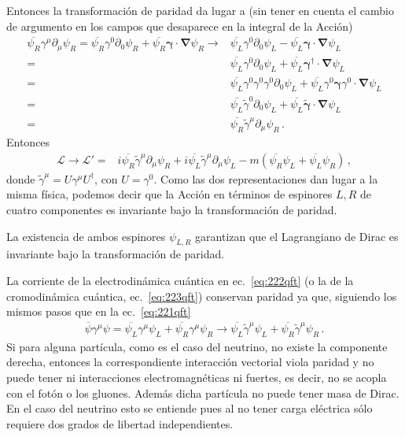 Entonces la transformación de paridad da lugar a (sin tener en cuenta el cambio de argumento en los campos que desaparece en la integral de la Acción)
\begin{align}
  \overline{\psi_R}\gamma^\mu\partial_\mu\psi_R=\overline{\psi_R}\gamma^0\partial_0\psi_R+\overline{\psi_R}\boldsymbol{\gamma}\cdot\boldsymbol{\nabla}\psi_R 
\to&\overline{\psi_L}\gamma^0\partial_0\psi_L-\overline{\psi_L}\boldsymbol{\gamma}\cdot\boldsymbol{\nabla}\psi_L\nonumber\\
=&\overline{\psi_L}\gamma^0\partial_0\psi_L+\overline{\psi_L}\boldsymbol{\gamma}^\dagger\cdot\boldsymbol{\nabla}\psi_L\nonumber\\
=&\overline{\psi_L}\gamma^0\gamma^0\gamma^0\partial_0\psi_L+\overline{\psi_L}\gamma^0\boldsymbol{\gamma}\gamma^0\cdot\boldsymbol{\nabla}\psi_L\nonumber\\
=&\overline{\psi_L}\tilde\gamma^0\partial_0\psi_L+\overline{\psi_L}\tilde{\boldsymbol{\gamma}}\cdot\boldsymbol{\nabla}\psi_L\nonumber\\
=&\overline{\psi_R}\tilde\gamma^\mu\partial_\mu\psi_R\,.
\end{align}
Entonces
\begin{align}
   \mathcal{L}\to\mathcal{L}'=&i\overline{\psi_R}\tilde\gamma^\mu\partial_\mu\psi_R+i\overline{\psi_L}\tilde\gamma^\mu\partial_\mu\psi_L-m(\overline{\psi_R}\psi_L+\overline{\psi_L}\psi_R)\,,
\end{align}
donde $\tilde\gamma^\mu=U\gamma^\mu U^\dagger$, con $U=\gamma^0$. Como las dos representaciones dan lugar a la misma física, podemos decir que la Acción en términos de espinores $L,R$ de cuatro componentes es invariante bajo la transformación de paridad.

La existencia de ambos espinores $\psi_{L,R}$ garantizan que el Lagrangiano de Dirac es invariante bajo la transformación de paridad. 

La corriente de la electrodinámica cuántica en ec.~\eqref{eq:222qft} (o la de la cromodinámica cuántica, ec.~\eqref{eq:223qft}) conservan paridad ya que, siguiendo los mismos pasos que en la ec.~\eqref{eq:221qft}
\begin{align}
  \label{eq:224qft}
  \overline{\psi}\gamma^\mu\psi=\overline{\psi_L}\gamma^\mu\psi_L+\overline{\psi_R}\gamma^\mu\psi_R\to\overline{\psi_L}\tilde{\gamma}^\mu\psi_L+\overline{\psi_R}\tilde{\gamma}^\mu\psi_R\,.
\end{align}
Si para alguna partícula, como es el caso del neutrino, no existe la componente derecha, entonces la correspondiente interacción vectorial viola paridad y no puede tener ni interacciones electromagnéticas ni fuertes, es decir, no se acopla con el fotón o los gluones. Además dicha partícula no puede tener masa de Dirac. En el caso del neutrino esto se entiende pues al no tener carga eléctrica sólo requiere dos grados de libertad independientes.


